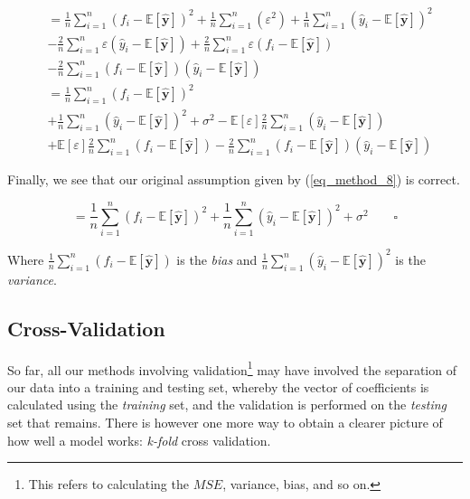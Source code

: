 \documentclass[a4paper,10pt,english]{article}
\begin{document}
\begin{align*}	
&= \frac{1}{n} \sum_{i=1}^{n} ( f_i - \mathbb{E}[\hat{\mathbf{y}}] )^2 
+ \frac{1}{n} \sum_{i=1}^{n} ( \varepsilon^2 )
+ \frac{1}{n} \sum_{i=1}^{n} ( \hat{y}_i - \mathbb{E}[\hat{\mathbf{y}}] )^2 
\\&- \frac{2}{n} \sum_{i=1}^{n} \varepsilon ( \hat{y}_i - \mathbb{E}[\hat{\mathbf{y}}] )
+ \frac{2}{n} \sum_{i=1}^{n} \varepsilon ( f_i - \mathbb{E}[\hat{\mathbf{y}}] )
\\&- \frac{2}{n} \sum_{i=1}^{n} ( f_i - \mathbb{E}[\hat{\mathbf{y}}] ) ( \hat{y}_i - \mathbb{E}[\hat{\mathbf{y}}] )
\\&= \frac{1}{n} \sum_{i=1}^{n} ( f_i - \mathbb{E}[\hat{\mathbf{y}}] )^2 
\\&+ \frac{1}{n} \sum_{i=1}^{n} ( \hat{y}_i - \mathbb{E}[\hat{\mathbf{y}}] )^2 
+ \sigma^2
- \mathbb{E}[\varepsilon] \frac{2}{n} \sum_{i=1}^{n} ( \hat{y}_i - \mathbb{E}[\hat{\mathbf{y}}] )
\\&+ \mathbb{E}[\varepsilon] \frac{2}{n} \sum_{i=1}^{n} ( f_i - \mathbb{E}[\hat{\mathbf{y}}] )
-\frac{2}{n} \sum_{i=1}^{n} ( f_i - \mathbb{E}[\hat{\mathbf{y}}] ) ( \hat{y}_i - \mathbb{E}[\hat{\mathbf{y}}] )
\end{align*}

Finally, we see that our original assumption given by (\ref{eq_method_8}) is correct.

\begin{equation*}
= \frac{1}{n} \sum_{i=1}^{n} ( f_i - \mathbb{E}[\hat{\mathbf{y}}] )^2 
+ \frac{1}{n} \sum_{i=1}^{n} ( \hat{y}_i - \mathbb{E}[\hat{\mathbf{y}}] )^2 
+ \sigma^2 \qquad \square
\end{equation*}

Where $\frac{1}{n} \sum_{i=1}^{n} ( f_i - \mathbb{E}[\hat{\mathbf{y}}] )$ is the \textit{bias} and
$\frac{1}{n} \sum_{i=1}^{n} ( \hat{y}_i - \mathbb{E}[\hat{\mathbf{y}}] )^2$ is the \textit{variance}.	

\subsection*{Cross-Validation}

So far, all our methods involving validation\footnote{This refers to calculating the $MSE$, variance, bias, and so on.} may have involved the separation of our data into a training and testing set, whereby the vector of coefficients is calculated using the \textit{training} set, and the validation is performed on the \textit{testing} set that remains.	There is however one more way to obtain a clearer picture of how well a model works: \textit{k-fold} cross validation.	
\end{document}
